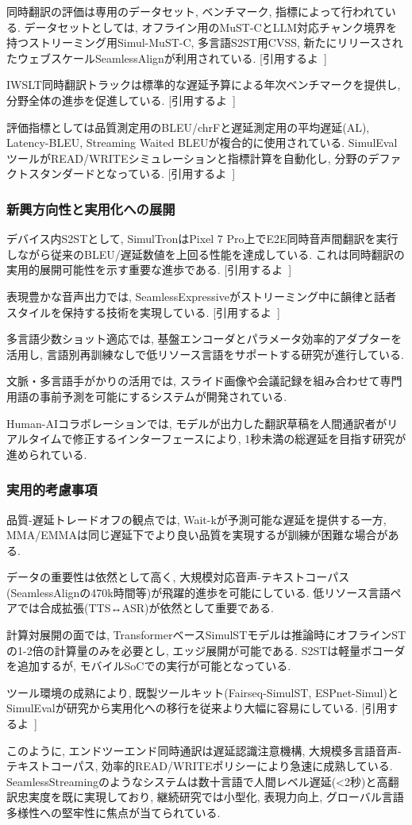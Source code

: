同時翻訳の評価は専用のデータセット, ベンチマーク, 指標によって行われている.
データセットとしては, オフライン用のMuST-CとLLM対応チャンク境界を持つストリーミング用Simul-MuST-C, 多言語S2ST用CVSS, 新たにリリースされたウェブスケールSeamlessAlignが利用されている.
[引用するよ~]

IWSLT同時翻訳トラックは標準的な遅延予算による年次ベンチマークを提供し, 分野全体の進歩を促進している.
[引用するよ~]

評価指標としては品質測定用のBLEU/chrFと遅延測定用の平均遅延(AL), Latency-BLEU, Streaming Waited BLEUが複合的に使用されている.
SimulEvalツールがREAD/WRITEシミュレーションと指標計算を自動化し, 分野のデファクトスタンダードとなっている.
[引用するよ~]

\subsubsection{新興方向性と実用化への展開}

デバイス内S2STとして, SimulTronはPixel 7 Pro上でE2E同時音声間翻訳を実行しながら従来のBLEU/遅延数値を上回る性能を達成している.
これは同時翻訳の実用的展開可能性を示す重要な進歩である.
[引用するよ~]

表現豊かな音声出力では, SeamlessExpressiveがストリーミング中に韻律と話者スタイルを保持する技術を実現している.
[引用するよ~]

多言語少数ショット適応では, 基盤エンコーダとパラメータ効率的アダプターを活用し, 言語別再訓練なしで低リソース言語をサポートする研究が進行している.

文脈・多言語手がかりの活用では, スライド画像や会議記録を組み合わせて専門用語の事前予測を可能にするシステムが開発されている.

Human-AIコラボレーションでは, モデルが出力した翻訳草稿を人間通訳者がリアルタイムで修正するインターフェースにより, 1秒未満の総遅延を目指す研究が進められている.

\subsubsection{実用的考慮事項}

品質-遅延トレードオフの観点では, Wait-kが予測可能な遅延を提供する一方, MMA/EMMAは同じ遅延下でより良い品質を実現するが訓練が困難な場合がある.

データの重要性は依然として高く, 大規模対応音声-テキストコーパス(SeamlessAlignの470k時間等)が飛躍的進歩を可能にしている.
低リソース言語ペアでは合成拡張(TTS↔ASR)が依然として重要である.

計算対展開の面では, TransformerベースSimulSTモデルは推論時にオフラインSTの1-2倍の計算量のみを必要とし, エッジ展開が可能である.
S2STは軽量ボコーダを追加するが, モバイルSoCでの実行が可能となっている.

ツール環境の成熟により, 既製ツールキット(Fairseq-SimulST, ESPnet-Simul)とSimulEvalが研究から実用化への移行を従来より大幅に容易にしている.
[引用するよ~]

このように, エンドツーエンド同時通訳は遅延認識注意機構, 大規模多言語音声-テキストコーパス, 効率的READ/WRITEポリシーにより急速に成熟している.
SeamlessStreamingのようなシステムは数十言語で人間レベル遅延(<2秒)と高翻訳忠実度を既に実現しており, 継続研究では小型化, 表現力向上, グローバル言語多様性への堅牢性に焦点が当てられている.